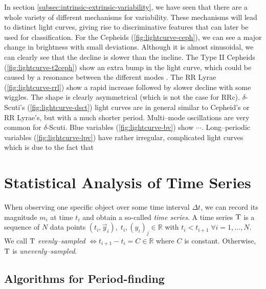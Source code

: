 
In section \ref{subsec:intrinsic-extrinsic-variability}, we have seen that there are a whole variety of different mechanisms for variability. These mechanisms will lead to distinct light curves, giving rise to discriminative features that can later be used for classification. For the Cepheids (\ref{fig:lightcurve-ceph}), we can see a major change in brightness with small deviations. Although it is almost sinusoidal, we can clearly see that the decline is slower than the incline. The Type II Cepheids (\ref{fig:lightcurve-t2ceph}) show an extra bump in the light curve, which could be caused by a resonance between the different modes \citep{caputo1999}. The RR Lyrae (\ref{fig:lightcurve-rrl}) show a rapid increase followed by slower decline with some wiggles. The shape is clearly asymmetrical (which is not the case for RRc). $\delta$-Scuti's (\ref{fig:lightcurve-dsct}) light curves are in general similar to Cepheid's or RR Lyrae's, but with a much shorter period. Multi--mode oscillations are very common for $\delta$-Scuti. Blue variables (\ref{fig:lightcurve-bv}) show $\cdots$. Long--periodic variables (\ref{fig:lightcurve-lpv}) have rather irregular, complicated light curves which is due to the fact that

\section{Statistical Analysis of Time Series}
\label{sec:statistical-analysis-time-series}

When observing one specific object over some time interval $\Delta t$, we can record its magnitude $m_i$ at time $t_i$ and obtain a so-called \emph{time series}. A time series $\mathrm{T}$ is a sequence of $N$ data points $(t_i, \vec y_i),\; t_i,(y_i)_j \in \mathbb{R}$ with $t_i < t_{i+1} \; \forall i = 1,\ldots,N$. We call $\mathrm{T}$ \emph{evenly--sampled} $\Leftrightarrow t_{i+1} - t_i = C \in \mathbb{R}$ where $C$ is constant. Otherwise, $\mathrm{T}$ is \emph{unevenly--sampled}.\\


\subsection{Algorithms for Period-finding}
\label{subsec:period-finding}


